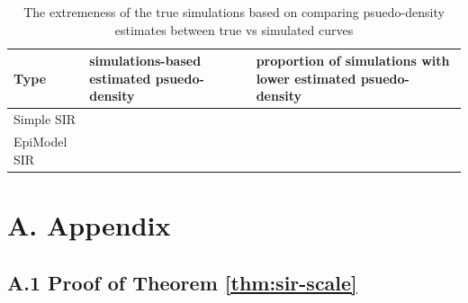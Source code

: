 \documentclass[
  shortnames]{jss}
\begin{document}
\begin{CodeChunk}
\begin{table}[!h]

\caption{\label{tab:hags-extreme}The extremeness of the true simulations based on comparing psuedo-density estimates between true vs simulated curves}
\centering
\begin{tabular}[t]{l>{\raggedleft\arraybackslash}p{6cm}>{\raggedleft\arraybackslash}p{6cm}}
\toprule
Type & simulations-based estimated psuedo-density & proportion of simulations with lower estimated psuedo-density\\
\midrule
Simple SIR & 0.0036733 & 0.00\\
EpiModel SIR & 0.0149686 & 0.02\\
\bottomrule
\end{tabular}
\end{table}

\end{CodeChunk}

\hypertarget{a.-appendix}{%
\section*{A. Appendix}\label{a.-appendix}}

\hypertarget{a.1-proof-of-theorem}{%
\subsection*{\texorpdfstring{A.1 Proof of Theorem
\ref{thm:sir-scale}}{A.1 Proof of Theorem }}\label{a.1-proof-of-theorem}}
\end{document}
